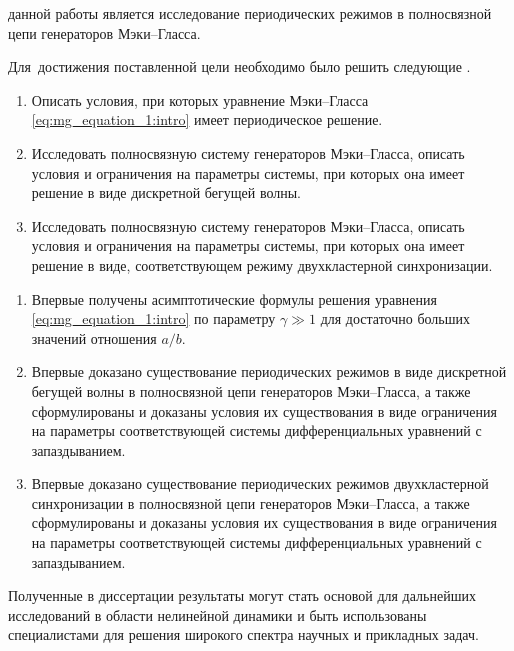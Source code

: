 
{\aim} данной работы является исследование периодических режимов в полносвязной цепи генераторов Мэки--Гласса.

Для~достижения поставленной цели необходимо было решить следующие {\tasks}.
\begin{enumerate}[beginpenalty=10000] %
	\item Описать условия, при которых уравнение Мэки--Гласса \eqref{eq:mg_equation_1:intro} имеет периодическое решение.
	\item Исследовать полносвязную систему генераторов Мэки--Гласса, описать условия и ограничения на параметры системы, при которых она имеет решение в виде дискретной бегущей волны.
	\item Исследовать полносвязную систему генераторов Мэки--Гласса, описать условия и ограничения на параметры системы, при которых она имеет решение в виде, соответствующем режиму двухкластерной синхронизации.
\end{enumerate}


{\novelty}
\begin{enumerate}[beginpenalty=10000] %
  \item Впервые получены асимптотические формулы решения уравнения \eqref{eq:mg_equation_1:intro} по параметру $\gamma \gg 1$ для достаточно больших значений отношения $a / b$.
  \item Впервые доказано существование периодических режимов в виде дискретной бегущей волны в полносвязной цепи генераторов Мэки--Гласса, а также сформулированы и доказаны условия их существования в виде ограничения на параметры соответствующей системы дифференциальных уравнений с запаздыванием.
  \item Впервые доказано существование периодических режимов двухкластерной синхронизации в полносвязной цепи генераторов Мэки--Гласса, а также сформулированы и доказаны условия их существования в виде ограничения на параметры соответствующей системы дифференциальных уравнений с запаздыванием. 
\end{enumerate}

{\influence} Полученные в диссертации результаты могут стать основой для дальнейших исследований в области нелинейной динамики и быть использованы специалистами для решения широкого спектра научных и прикладных задач.


